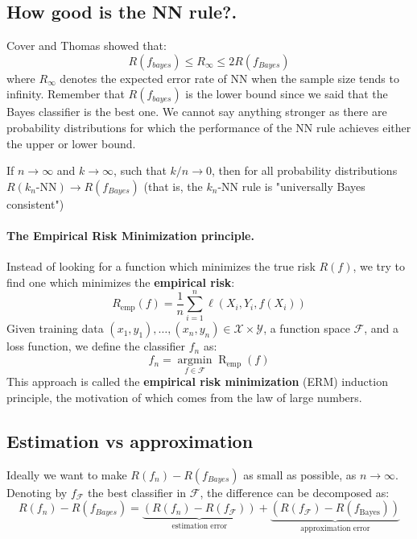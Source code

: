 \subsection{How good is the NN rule?.} Cover and Thomas showed that:
$$R(f_{bayes}) \leq R_\infty \leq 2R(f_{Bayes})$$
where $R_{\infty}$ denotes the expected error rate of NN when the sample size tends to infinity. Remember that $R(f_{bayes})$ is the lower bound since we said that the Bayes classifier is the best one. We cannot say anything stronger as there are probability distributions for which the performance of the NN rule achieves either the upper or lower bound. 
\begin{thm}
	If $n \rightarrow \infty$ and $k \rightarrow \infty$, such that $k/n \rightarrow 0$, then for all probability distributions $R(k_n\text{-NN}) \rightarrow R(f_{Bayes})$ (that is, the $k_n$-NN rule is "universally Bayes consistent")
\end{thm}

\paragraph*{The Empirical Risk Minimization principle.} Instead of looking for a function which minimizes the true risk $R(f)$, we try to find one which minimizes the \textbf{empirical risk}:
$$R _ { \mathrm { emp } } ( f ) = \frac { 1 } { n } \sum _ { i = 1 } ^ { n } \ell \left( X _ { i } , Y _ { i } , f \left( X _ { i } \right) \right)$$
Given training data $(x_1,y_1), \dots, (x_n, y_n) \in \mathcal{X} \times \mathcal{Y}$, a function space $\mathcal{F}$, and a loss function, we define the classifier $f_n$ as:
$$f _ { n } = \underset { f \in \mathcal { F } } { \operatorname { argmin } } \operatorname { R } _ { \mathrm { emp } } ( f )$$
This approach is called the \textbf{empirical risk minimization} (ERM) induction principle, the motivation of which comes from the law of large numbers.
\subsection{Estimation vs approximation}
Ideally we want to make $R(f_n) - R(f_{Bayes})$ as small as possible, as $n \rightarrow \infty$. Denoting by $f_{\mathcal{ F }}$ the best classifier in $\mathcal{ F }$, the difference can be decomposed as:
$$R \left( f _ { n } \right) - R \left( f _ { B a y e s } \right) = \underbrace{\left( R \left( f _ { n } \right) - R \left( f _ { \mathcal { F } } \right) \right)}_{\text{estimation error}} + \underbrace{\left( R \left( f _ { \mathcal { F } } \right) - R \left( f _ { \text {Bayes} } \right) \right)}_{\text{approximation error}}$$

